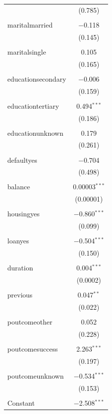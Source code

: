 \documentclass[11pt]{article}
\begin{document}
{\begin{table}[H]
{\begin{tabular}{@{\extracolsep{5pt}}lc}
  & (0.785) \\ 
  & \\ 
 maritalmarried & $-$0.118 \\ 
  & (0.145) \\ 
  & \\ 
 maritalsingle & 0.105 \\ 
  & (0.165) \\ 
  & \\ 
 educationsecondary & $-$0.006 \\ 
  & (0.159) \\ 
  & \\ 
 educationtertiary & 0.494$^{***}$ \\ 
  & (0.186) \\ 
  & \\ 
 educationunknown & 0.179 \\ 
  & (0.261) \\ 
  & \\ 
 defaultyes & $-$0.704 \\ 
  & (0.498) \\ 
  & \\ 
 balance & 0.00003$^{***}$ \\ 
  & (0.00001) \\ 
  & \\ 
 housingyes & $-$0.860$^{***}$ \\ 
  & (0.099) \\ 
  & \\ 
 loanyes & $-$0.504$^{***}$ \\ 
  & (0.150) \\ 
  & \\ 
 duration & 0.004$^{***}$ \\ 
  & (0.0002) \\ 
  & \\ 
 previous & 0.047$^{**}$ \\ 
  & (0.022) \\ 
  & \\ 
 poutcomeother & 0.052 \\ 
  & (0.228) \\ 
  & \\ 
 poutcomesuccess & 2.263$^{***}$ \\ 
  & (0.197) \\ 
  & \\ 
 poutcomeunknown & $-$0.534$^{***}$ \\ 
  & (0.153) \\ 
  & \\ 
 Constant & $-$2.508$^{***}$ \\ 

\end{tabular}}
\end{table}}
\end{document}
